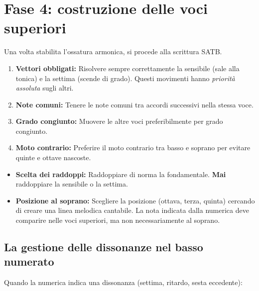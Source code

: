 \section{Fase 4: costruzione delle voci superiori}
\label{sec:fase4_numerato}

Una volta stabilita l'ossatura armonica, si procede alla scrittura SATB.

\begin{regola}
	\label{reg:priorita_scrittura_numerato}
	\begin{enumerate}
		\item \textbf{Vettori obbligati:} Risolvere sempre correttamente la sensibile (sale alla tonica) e la settima (scende di grado). Questi movimenti hanno \textit{priorità assoluta} sugli altri.
		\item \textbf{Note comuni:} Tenere le note comuni tra accordi successivi nella stessa voce.
		\item \textbf{Grado congiunto:} Muovere le altre voci preferibilmente per grado congiunto.
		\item \textbf{Moto contrario:} Preferire il moto contrario tra basso e soprano per evitare quinte e ottave nascoste.
	\end{enumerate}
\end{regola}

\begin{itemize}
	\item \textbf{Scelta dei raddoppi:} Raddoppiare di norma la fondamentale. \textbf{Mai} raddoppiare la sensibile o la settima.
	\item \textbf{Posizione al soprano:} Scegliere la posizione (ottava, terza, quinta) cercando di creare una linea melodica cantabile. La nota indicata dalla numerica deve comparire nelle voci superiori, ma non necessariamente al soprano.
\end{itemize}

\subsection{La gestione delle dissonanze nel basso numerato}

Quando la numerica indica una dissonanza (settima, ritardo, sesta eccedente):

